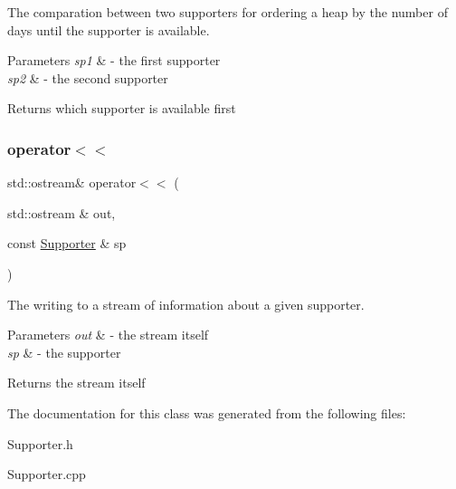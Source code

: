 The comparation between two supporters for ordering a heap by the number of days until the supporter is available. 


\begin{DoxyParams}{Parameters}
{\em sp1} & -\/ the first supporter \\
\hline
{\em sp2} & -\/ the second supporter \\
\hline
\end{DoxyParams}
\begin{DoxyReturn}{Returns}
which supporter is available first 
\end{DoxyReturn}
\mbox{\label{class_supporter_a7f6725df03a27dab255cbcef909e590e}} 
\subsubsection{\texorpdfstring{operator$<$$<$}{operator<<}}
{\footnotesize\ttfamily std\+::ostream\& operator$<$$<$ (\begin{DoxyParamCaption}\item[{std\+::ostream \&}]{out,  }\item[{const \mbox{\hyperlink{class_supporter}{Supporter}} \&}]{sp }\end{DoxyParamCaption})\hspace{0.3cm}{\ttfamily [friend]}}



The writing to a stream of information about a given supporter. 


\begin{DoxyParams}{Parameters}
{\em out} & -\/ the stream itself \\
\hline
{\em sp} & -\/ the supporter \\
\hline
\end{DoxyParams}
\begin{DoxyReturn}{Returns}
the stream itself 
\end{DoxyReturn}


The documentation for this class was generated from the following files\+:\begin{DoxyCompactItemize}
\item 
Supporter.\+h\item 
Supporter.\+cpp\end{DoxyCompactItemize}
